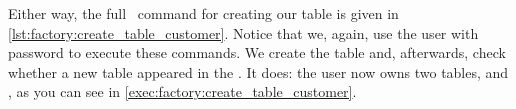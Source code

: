 Either way, the full \sql\ command for creating our table  is given in \cref{lst:factory:create_table_customer}.
Notice that we, again, use the  user with password  to execute these commands.
We create the table and, afterwards, check whether a new table appeared in the .
It does: the user  now owns two tables,  and , as you can see in \cref{exec:factory:create_table_customer}.%
%
\endhsection%
%
